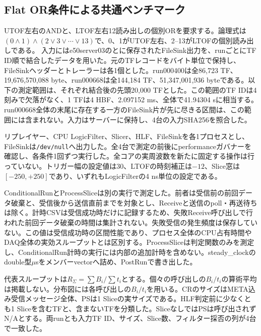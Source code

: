 \subsection{Flat OR条件による共通ベンチマーク}
\label{sec:flat-or-common}
UTOF左右のANDと、LTOF左右12読み出しの個別ORを要求する。論理式は$(0\land1)\land(2\lor3\lor\cdots\lor13)$で、0、1がUTOF左右、2--13がLTOFの個別読み出しである。
入力にはe50server03のとに保存されたFileSink出力を、runごとにTF ID順で結合したデータを用いた。元のTFレコードをバイト単位で保持し、FileSinkヘッダーとトレーラーは各1個とした。run000400は全86,723 TF、19,676,570,088 byte、run000668は全144,184 TF、51,347,001,936 byteである。以下の測定範囲は、それぞれ結合後の先頭20,000 TFとした。この範囲のTF IDは4刻みで欠落がなく、1 TFは4 HBF、2.097152 ms、全体で41.94304 sに相当する。run000668全体の末尾に存在する一方のFileSink片が先に尽きる区間は、この範囲には含まれない。入力はサーバーに保持し、4台の入力SHA256を照合した。

リプレイヤー、CPU LogicFilter、Slicer、HLF、FileSinkを各1プロセスとし、FileSinkは\texttt{/dev/null}へ出力した。全4台で測定の前後にperformanceガバナーを確認し、各条件1回ずつ実行した。全コアの実周波数を新たに固定する操作は行っていない。トリガー幅の設定値は30、LTOFの時刻補正は$-12$、Slice窓は$[-250,+250]$であり、いずれもLogicFilterの4 ns単位の設定である。

ConditionalRunとProcessSliceは別の実行で測定した。前者は受信前の前回データ破棄と、受信後から送信直前までを対象とし、Receiveと送信のpoll・再送待ちは除く。計時CSVは受信成功時だけに記録するため、失敗Receive呼び出しで行われた前回データ破棄の時間は集計されない。失敗受信の発生頻度は保存していない。この値は受信成功時の区間性能であり、プロセス全体のCPU占有時間やDAQ全体の実効スループットとは区別する。ProcessSliceは判定関数のみを測定し、ConditionalRun計時の実行には内部の追加計時を含めない。steady\_clockのdouble型$\mu$sをメンバーvectorへ詰め、PostRunで書き出した。

代表スループットは$R_\Sigma=\sum B_i/\sum t_i$とする。個々の呼び出しの$B_i/t_i$の算術平均は掲載しない。分布図には各呼び出しの$B_i/t_i$を用いる。CRのサイズはMETA込み受信メッセージ全体、PSは1 Sliceの実サイズである。HLF判定前に少なくとも1 Sliceを含むTFと、含まないTFを分類した。SliceなしではPSは呼び出されずN/Aとする。両runとも入力TF ID、サイズ、Slice数、フィルター採否の列が4台で一致した。

